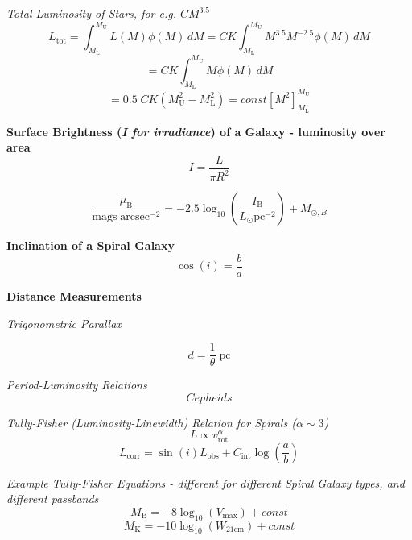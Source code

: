 \documentclass{article}
\begin{document}
\textit {Total Luminosity of Stars, for e.g. \(CM^{3.5}\)}
\begin{equation}
L_\mathrm{tot} =  \int_{M_\mathrm{L}}^{M_\mathrm{U}} L(M) \phi(M) \,dM =  CK \int_{M_\mathrm{L}}^{M_\mathrm{U}} M^{3.5} M^{-2.5} \phi(M) \,dM 
\end{equation}
\begin{equation}
=  CK \int_{M_\mathrm{L}}^{M_\mathrm{U}} M \phi(M) \,dM
\end{equation}
\begin{equation}
= 0.5 \; CK \left( M^2_\mathrm{U} - M^2_\mathrm{L} \right) =  const \left[ M^2 \right] ^{M_\mathrm{U}}_{M_\mathrm{L}}
\end{equation}

\textbf {Surface Brightness (\textit{I for irradiance}) of a Galaxy - luminosity over area}
\begin{equation}
I = \frac{L}{\pi R^2}
\end{equation}

\begin{equation}
\frac{\mu_\mathrm{B}}{\mathrm{mags \; arcsec}^{-2}} = -2.5 \log_\mathrm{10} \left(\frac{I_\mathrm{B}}{L_\odot \mathrm{pc}^{-2}} \right) + M_{\odot, B}
\end{equation}

\textbf {Inclination of a Spiral Galaxy}
\begin{equation}
\cos(i) = \frac {b}{a}
\end{equation}

\textbf {Distance Measurements}

\textit{Trigonometric Parallax}

\begin{equation}
d = \frac {1}{\theta} \; \mathrm{pc}
\end{equation}

\textit{Period-Luminosity Relations}
\begin{equation}
Cepheids
\end{equation}

\textit {Tully-Fisher (Luminosity-Linewidth) Relation for Spirals (\(\alpha \sim 3\))}
\begin{equation}
L \propto v_\mathrm{rot}^\alpha
\end{equation}
\begin{equation}
L_\mathrm{corr} = \sin(i) L_\mathrm{obs} + C_\mathrm{int} \log \left(\frac{a}{b}\right)
\end{equation}

\textit{Example Tully-Fisher Equations - different for different Spiral Galaxy types, and different passbands}
\begin{equation}
M_\mathrm{B} = -8 \log_\mathrm{10}(V_\mathrm{max}) + const
\end{equation}
\begin{equation}
M_\mathrm{K} = -10 \log_\mathrm{10}(W_\mathrm{21cm}) + const
\end{equation}
\end{document}
